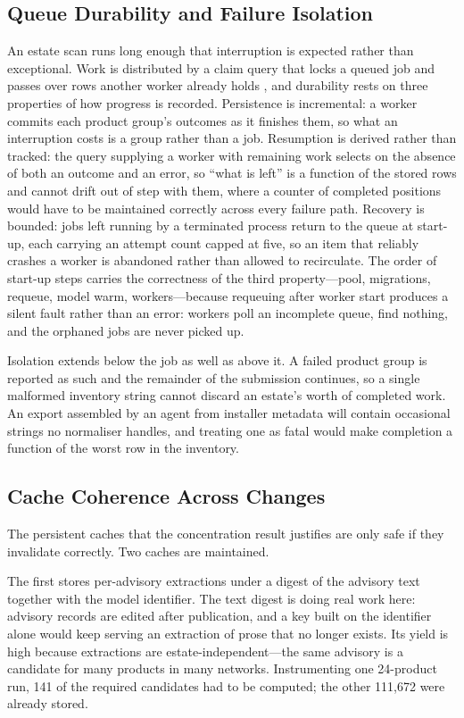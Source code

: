 \documentclass[fleqn,10pt,lineno]{wlpeerj}
\begin{document}
\subsection{Queue Durability and Failure Isolation}
An estate scan runs long enough that interruption is expected rather than exceptional. Work is distributed by a claim query that locks a queued job and passes over rows another worker already holds \cite{gray1992}, and durability rests on three properties of how progress is recorded. Persistence is incremental: a worker commits each product group's outcomes as it finishes them, so what an interruption costs is a group rather than a job. Resumption is derived rather than tracked: the query supplying a worker with remaining work selects on the absence of both an outcome and an error, so ``what is left'' is a function of the stored rows and cannot drift out of step with them, where a counter of completed positions would have to be maintained correctly across every failure path. Recovery is bounded: jobs left running by a terminated process return to the queue at start-up, each carrying an attempt count capped at five, so an item that reliably crashes a worker is abandoned rather than allowed to recirculate. The order of start-up steps carries the correctness of the third property---pool, migrations, requeue, model warm, workers---because requeuing after worker start produces a silent fault rather than an error: workers poll an incomplete queue, find nothing, and the orphaned jobs are never picked up.

Isolation extends below the job as well as above it. A failed product group is reported as such and the remainder of the submission continues, so a single malformed inventory string cannot discard an estate's worth of completed work. An export assembled by an agent from installer metadata will contain occasional strings no normaliser handles, and treating one as fatal would make completion a function of the worst row in the inventory.

\subsection{Cache Coherence Across Changes}
The persistent caches that the concentration result justifies are only safe if they invalidate correctly. Two caches are maintained.

The first stores per-advisory extractions under a digest of the advisory text together with the model identifier. The text digest is doing real work here: advisory records are edited after publication, and a key built on the identifier alone would keep serving an extraction of prose that no longer exists. Its yield is high because extractions are estate-independent---the same advisory is a candidate for many products in many networks. Instrumenting one 24-product run, 141 of the required candidates had to be computed; the other 111,672 were already stored.
\end{document}
